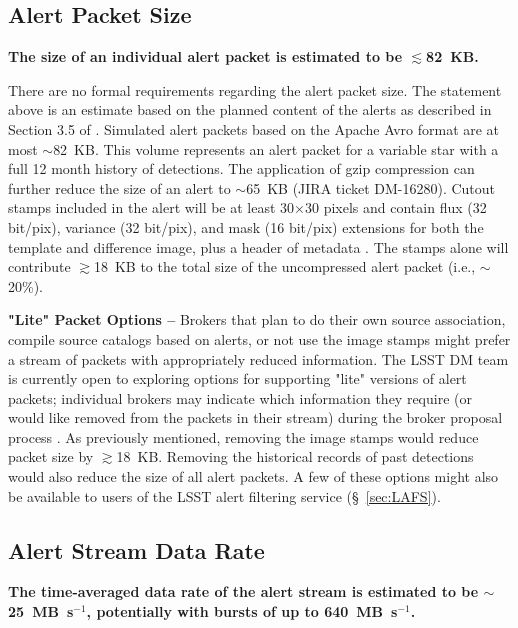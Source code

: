 \documentclass[DM,lsstdraft,authoryear,toc]{lsstdoc}
\begin{document}
\subsection{Alert Packet Size}\label{ssec:packet_size}

{\bf The size of an individual alert packet is estimated to be $\lesssim$82~KB.}

There are no formal requirements regarding the alert packet size. The statement above is an estimate based on the planned content of the alerts as described in Section 3.5 of . Simulated alert packets based on the Apache Avro format are at most $\sim$82~KB. This volume represents an alert packet for a variable star with a full 12 month history of detections. The application of gzip compression can further reduce the size of an alert to $\sim$65~KB (JIRA ticket DM-16280). Cutout stamps included in the alert will be at least 30$\times$30 pixels and contain flux (32 bit/pix), variance (32 bit/pix), and mask (16 bit/pix) extensions for both the template and difference image, plus a header of metadata . The stamps alone will contribute $\gtrsim$18~KB to the total size of the uncompressed alert packet (i.e., $\sim$20\%).

{\bf "Lite" Packet Options --} Brokers that plan to do their own source association, compile source catalogs based on alerts, or not use the image stamps might prefer a stream of packets with appropriately reduced information. 
The LSST DM team is currently open to exploring options for supporting "lite" versions of alert packets; individual brokers may indicate which information they require (or would like removed from the packets in their stream) during the broker proposal process .
As previously mentioned, removing the image stamps would reduce packet size by $\gtrsim$18~KB. Removing the historical records of past detections would also reduce the size of all alert packets. 
A few of these options might also be available to users of the LSST alert filtering service (\S~\ref{sec:LAFS}).

\subsection{Alert Stream Data Rate}\label{ssec:data_rate}

{\bf The time-averaged data rate of the alert stream is estimated to be $\sim$25~MB~s$^{-1}$, potentially with bursts of up to 640~MB~s$^{-1}$.}
\end{document}

